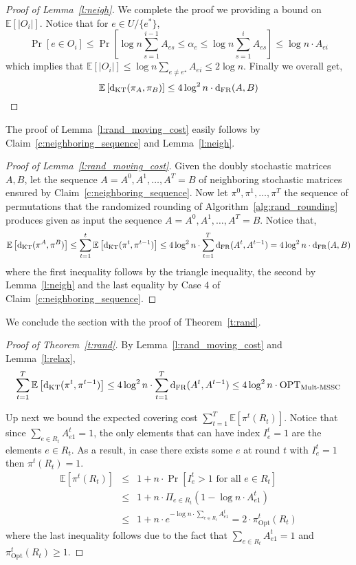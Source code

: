 \begin{proof}[Proof of Lemma~\ref{l:neigh}]
\noindent We complete the proof we providing a bound on $\mathbb{E}\left[|O_i|\right]$.  Notice that for $e \in U/ \{e^\ast\}$,
$$ \Pr[ e \in O_{i}] \leq \Pr \left [ \log n \sum_{s=1}^{i-1} A_{es} \leq \alpha_e \leq \log n \sum_{s=1}^{i} A_{es}\right] \leq \log n \cdot A_{ei} $$
which implies that $\mathbb{E}\left[|O_i|\right] \leq \log n \sum_{e \neq e^\star} A_{ei} \leq 2 \log n$. Finally we overall get,
$$\mathbb{E}\left[\mathrm{d}_{\mathrm{KT}}(\pi_A,\pi_B) \right] \leq
4\log^2 n \cdot \mathrm{d}_{\mathrm{FR}}(A,B)$$
\end{proof}

\noindent The proof of Lemma~\ref{l:rand_moving_cost} easily follows by Claim~\ref{c:neighboring_sequence} and Lemma~\ref{l:neigh}. 

\begin{proof}[Proof of Lemma~\ref{l:rand_moving_cost}] Given the doubly stochastic matrices $A,B$, let the sequence  
$A = A^0,A^1,\ldots,A^T = B$ of neighboring stochastic matrices ensured by  Claim~\ref{c:neighboring_sequence}. Now let $\pi^0,\pi^1,\ldots,\pi^T$ the sequence of permutations that the randomized rounding of Algorithm~\ref{alg:rand_rounding} produces given as input the sequence $A = A^0,A^1,\ldots,A^T = B$. Notice that,
\[\mathbb{E}\left[\mathrm{d}_{\mathrm{KT}}(\pi^A,\pi^B)\right] \leq
\sum_{t=1}^t \mathbb{E}\left[\mathrm{d}_{\mathrm{KT}}(\pi^t,\pi^{t-1})\right]
\leq 4\log^2 n \cdot 
\sum_{t=1}^T\mathrm{d}_{\mathrm{FR}}(A^t,A^{t-1})
=  4\log^2 n \cdot \mathrm{d}_{\mathrm{FR}}(A,B)\]
where the first inequality follows by the triangle inequality, the second by Lemma~\ref{l:neigh}
and the last equality by Case $4$ of Claim~\ref{c:neighboring_sequence}.
\end{proof}

\noindent We conclude the section with the proof of Theorem~\ref{t:rand}.
\begin{proof}[Proof of Theorem~\ref{t:rand}]
By Lemma~\ref{l:rand_moving_cost} and Lemma~\ref{l:relax},
$$ \sum_{t=1}^T \mathbb{E}\left[\mathrm{d}_{\mathrm{KT}}(\pi^t,\pi^{t-1})\right] \leq 
4\log^2 n \cdot \sum_{t=1}^T \mathrm{d}_{\mathrm{FR}}(A^t,A^{t-1}) \leq 4\log^2 n \cdot \mathrm{OPT}_{\mathrm{Mult}\text{-}\mathrm{MSSC}}
$$

\noindent Up next we bound the expected covering cost $\sum_{t=1}^T \mathbb{E}\left[\pi^t(R_t)\right]$. Notice that since $\sum_{e \in R_t} A_{e1}^t = 1$, the only elements that can have index $I_e^t = 1$ are the elements $e \in R_t$. As a result, in case there exists some $e$ at round $t$ with $I_e^t = 1$ then $\pi^t(R_t) = 1$.
\begin{eqnarray*}
\mathbb{E}\left[\pi^t(R_t)\right] &\leq& 1 + n \cdot \Pr \left[ I_e^t >1 \text{ for all } e\in R_t \right]\\
&\leq& 1 + n \cdot \Pi_{e \in R_t} \left(1 - \log n \cdot A_{e1}^t\right)\\
&\leq& 1 + n \cdot e^{- \log n \cdot \sum_{e \in R_t}A_{e1}^t}= 2 \cdot  \pi_{\mathrm{Opt}}^t(R_t)
\end{eqnarray*}
where the last inequality follows due to the fact that $\sum_{e \in R_t} A_{e1}^t = 1$ and $\pi_{\mathrm{Opt}}^t(R_t) \geq 1$.
\end{proof}